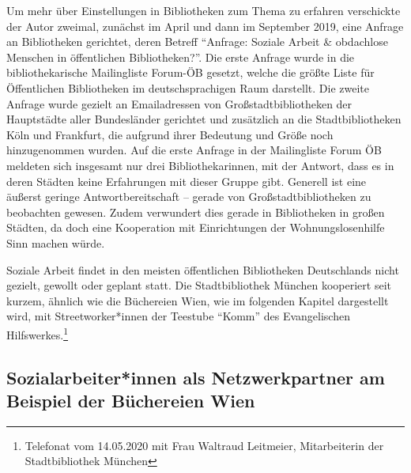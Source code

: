 \documentclass[a4paper,
fontsize=11pt,
oneside,
numbers=noperiodatend,
parskip=half-,
bibliography=totoc,
final
]{scrartcl}
\begin{document}
Um mehr über Einstellungen in Bibliotheken zum Thema zu erfahren
verschickte der Autor zweimal, zunächst im April und dann im September
2019, eine Anfrage an Bibliotheken gerichtet, deren Betreff
\enquote{Anfrage: Soziale Arbeit \& obdachlose Menschen in öffentlichen
Bibliotheken?}. Die erste Anfrage wurde in die bibliothekarische
Mailingliste Forum-ÖB gesetzt, welche die größte Liste für Öffentlichen
Bibliotheken im deutschsprachigen Raum darstellt. Die zweite Anfrage
wurde gezielt an Emailadressen von Großstadtbibliotheken der Hauptstädte
aller Bundesländer gerichtet und zusätzlich an die Stadtbibliotheken
Köln und Frankfurt, die aufgrund ihrer Bedeutung und Größe noch
hinzugenommen wurden. Auf die erste Anfrage in der Mailingliste Forum ÖB
meldeten sich insgesamt nur drei Bibliothekarinnen, mit der Antwort,
dass es in deren Städten keine Erfahrungen mit dieser Gruppe gibt.
Generell ist eine äußerst geringe Antwortbereitschaft -- gerade von
Großstadtbibliotheken zu beobachten gewesen. Zudem verwundert dies
gerade in Bibliotheken in großen Städten, da doch eine Kooperation mit
Einrichtungen der Wohnungslosenhilfe Sinn machen würde.

Soziale Arbeit findet in den meisten öffentlichen Bibliotheken
Deutschlands nicht gezielt, gewollt oder geplant statt. Die
Stadtbibliothek München kooperiert seit kurzem, ähnlich wie die
Büchereien Wien, wie im folgenden Kapitel dargestellt wird, mit
Streetworker*innen der Teestube \enquote{Komm} des Evangelischen
Hilfswerkes.\footnote{Telefonat vom 14.05.2020 mit Frau Waltraud
  Leitmeier, Mitarbeiterin der Stadtbibliothek München}

\hypertarget{sozialarbeiterinnen-als-netzwerkpartner-am-beispiel-der-buxfcchereien-wien}{%
\subsection{Sozialarbeiter*innen als Netzwerkpartner am Beispiel der
Büchereien
Wien}\label{sozialarbeiterinnen-als-netzwerkpartner-am-beispiel-der-buxfcchereien-wien}}
\end{document}
